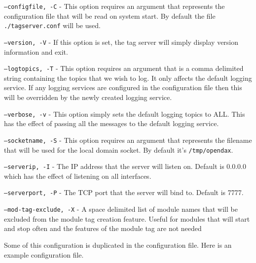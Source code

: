 	\begin{list}{}{Command Line Options}
		\item[\texttt{--configfile, -C}] - This option requires an argument that
		represents the configuration file that will be read on system start.  By default
		the file \texttt{./tagserver.conf} will be used.
		\item[\texttt{--version, -V}] - If this option is set, the tag server will
		simply display version information and exit.
		\item[\texttt{--logtopics, -T}] - This option requires an argument that is a
		comma delimited string containing the topics that we wish to log.  It only
		affects the default logging service.  If any logging services are configured in
		the configuration file then this will be overridden by the newly created logging
		service.
		\item[\texttt{--verbose, -v}] - This option simply sets the default logging
		topics to ALL.  This has the effect of passing all the messages to the default
		logging service.
		\item[\texttt{--socketname, -S}] - This option requires an argument that
		represents the filename that will be used for the local domain socket.  By
		default it's \texttt{/tmp/opendax}.
		\item[\texttt{--serverip, -I}] - The IP address that the server will listen on.
		Default is 0.0.0.0 which has the effect of listening on all interfaces.
		\item[\texttt{--serverport, -P}] - The TCP port that the server will bind to.
		Default is 7777.
		\item[\texttt{--mod-tag-exclude, -X}] - A space delimited list of module names
		that will be excluded from the module tag creation feature.  Useful for modules
		that will start and stop often and the features of the module tag are not needed
	\end{list}

	Some of this configuration is duplicated in the configuration file.  Here is an
	example configuration file.


